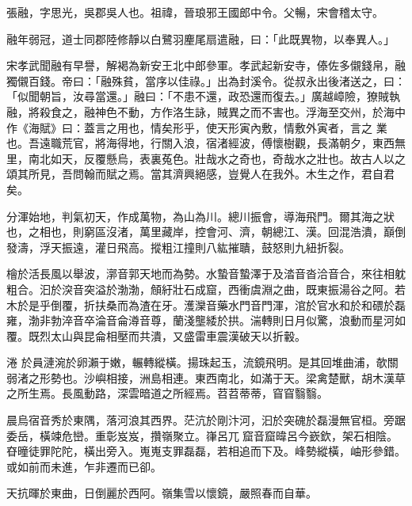 
\begin{pinyinscope}

 張融，字思光，吳郡吳人也。祖禕，晉琅邪王國郎中令。父暢，宋會稽太守。



 融年弱冠，道士同郡陸修靜以白鷺羽麈尾扇遣融，曰：「此既異物，以奉異人。」



 宋孝武聞融有早譽，解褐為新安王北中郎參軍。孝武起新安寺，傣佐多儭錢帛，融獨儭百錢。帝曰：「融殊貧，當序以佳祿。」出為封溪令。從叔永出後渚送之，曰：「似聞朝旨，汝尋當還。」融曰：「不患不還，政恐還而復去。」廣越嶂險，獠賊執融，將殺食之，融神色不動，方作洛生詠，賊異之而不害也。浮海至交州，於海中作《海賦》曰：蓋言之用也，情矣形乎，使天形寅內敷，情敷外寅者，言之
 業也。吾遠職荒官，將海得地，行關入浪，宿渚經波，傅懷樹觀，長滿朝夕，東西無里，南北如天，反覆懸烏，表裏菟色。壯哉水之奇也，奇哉水之壯也。故古人以之頌其所見，吾問翰而賦之焉。當其濟興絕感，豈覺人在我外。木生之作，君自君矣。



 分渾始地，判氣初天，作成萬物，為山為川。總川振會，導海飛門。爾其海之狀也，之相也，則窮區沒渚，萬里藏岸，控會河、濟，朝總江、漢。回混浩潰，巔倒發濤，浮天振遠，灌日飛高。摐粗江撞則八紘摧聵，鼓怒則九紐折裂。



 檜於活長風以舉波，漷音郭天地而為勢。水蟄音蟄澤于及涾音沓洽音合，來往相躭粗合。汩於湥音突溢於渤渤，頠紆壯石成窟，西衝虞淵之曲，既東振湯谷之阿。若木於是乎倒覆，折扶桑而為渣在牙。濩灤音藥水門音門渾，涫於官水和於和碨於磊雍，渤非勃淬音卒淪音侖澊音尊，蘭淺壟緌於拱。湍轉則日月似驚，浪動而星河如覆。既烈太山與昆侖相壓而共潰，又盛雷車震漢破天以折轂。



 淃
 於員漣涴於卵瀨于嫩，輾轉縱橫。揚珠起玉，流鏡飛明。是其回堆曲浦，欹關弱渚之形勢也。沙嶼相接，洲島相連。東西南北，如滿于天。梁禽楚獸，胡木漢草之所生焉。長風動路，深雲暗道之所經焉。苕苕蒂蒂，窅窅翳翳。



 晨烏宿音秀於東隅，落河浪其西界。茫沆於剛汴河，汩於突磈於磊漫無官桓。旁踞委岳，橫竦危巒。重彰岌岌，攢嶺聚立。嵂呂兀窟音窟暐呂今嶔欽，架石相陰。昚曈徒罪陀陀，橫出旁入。嵬嵬支罪磊磊，若相追而下及。峰勢縱橫，岫形參錯。或如前而未進，乍非遷而已卻。



 天抗暉於東曲，日倒麗於西阿。嶺集雪以懷鏡，嚴照春而自華。




\end{pinyinscope}
